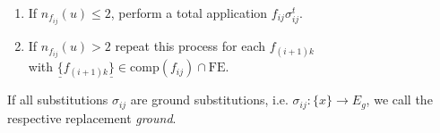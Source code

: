 \begin{definition}[Replacements]
\begin{enumerate}
\begin{enumerate}
  \item \label{a} If $n_{f_{ij}}(u)\leq 2$, perform a total application $ f_{ij}\sigma_{ij}^t$. %
  \item \label{b} If $n_{f_{ij}}(u)>2$ 
  repeat %
  this process
  for each $f_{(i+1) k}$\\with  
  $\underline{\texttt{\{}} f_{(i+1)k} \underline{\texttt{\}}}\in \text{comp}(f_{ij})\cap \text{FE}$. %
 \end{enumerate}

\end{enumerate}
If all substitutions $\sigma_{ij}$ are ground substitutions, i.e. $\sigma_{ij}:\{x\}\rightarrow E_g$, we call the respective replacement \emph{ground}. %
 \end{definition}


